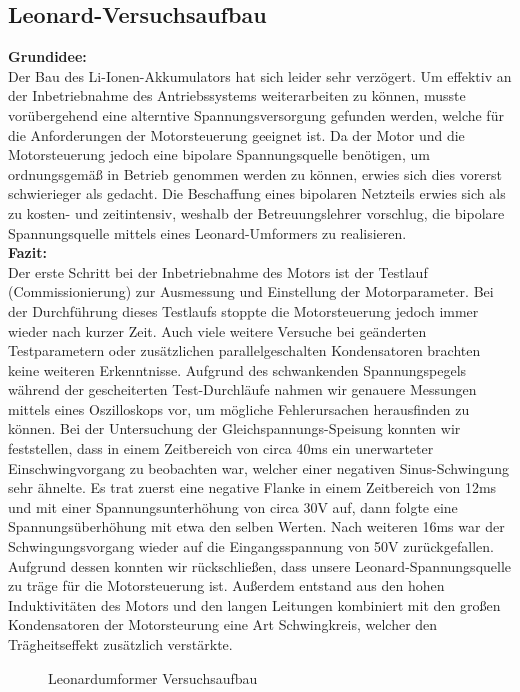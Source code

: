 \subsection{Leonard-Versuchsaufbau}
\textbf{Grundidee:}
\\[2mm]
Der Bau des Li-Ionen-Akkumulators hat sich leider sehr verzögert. Um effektiv an der Inbetriebnahme des Antriebssystems weiterarbeiten zu können, musste vorübergehend eine alterntive Spannungsversorgung gefunden werden, welche für die Anforderungen der Motorsteuerung geeignet ist. Da der Motor und die Motorsteuerung jedoch eine bipolare Spannungsquelle benötigen, um ordnungsgemäß in Betrieb genommen werden zu können, erwies sich dies vorerst schwierieger als gedacht. Die Beschaffung eines bipolaren Netzteils erwies sich als zu kosten- und zeitintensiv, weshalb der Betreuungslehrer vorschlug, die bipolare Spannungsquelle mittels eines Leonard-Umformers zu realisieren.
\\[5mm]

\textbf{Fazit:}
\\[2mm]
Der erste Schritt bei der Inbetriebnahme des Motors ist der Testlauf (Commissionierung) zur Ausmessung und Einstellung der Motorparameter. Bei der Durchführung dieses Testlaufs stoppte die Motorsteuerung jedoch immer wieder nach kurzer Zeit. Auch viele weitere Versuche bei geänderten Testparametern oder zusätzlichen parallelgeschalten Kondensatoren brachten keine weiteren Erkenntnisse. Aufgrund des schwankenden Spannungspegels während der gescheiterten Test-Durchläufe nahmen wir genauere Messungen mittels eines Oszilloskops vor, um mögliche Fehlerursachen herausfinden zu können. Bei der Untersuchung der Gleichspannungs-Speisung konnten wir feststellen, dass in einem Zeitbereich von circa 40ms ein unerwarteter Einschwingvorgang zu beobachten war, welcher einer negativen Sinus-Schwingung sehr ähnelte. Es trat zuerst eine negative Flanke in einem Zeitbereich von 12ms und mit einer Spannungsunterhöhung von circa 30V auf, dann folgte eine Spannungsüberhöhung mit etwa den selben Werten. Nach weiteren 16ms war der Schwingungsvorgang wieder auf die Eingangsspannung von 50V zurückgefallen. Aufgrund dessen konnten wir rückschließen, dass unsere Leonard-Spannungsquelle zu träge für die Motorsteuerung ist. Außerdem entstand aus den hohen Induktivitäten des Motors und den langen Leitungen kombiniert mit den großen Kondensatoren der Motorsteurung eine Art Schwingkreis, welcher den Trägheitseffekt zusätzlich verstärkte.

\begin{figure}[H]
	\begin{center}
		\caption{Leonardumformer Versuchsaufbau}
	\end{center}
\end{figure}

